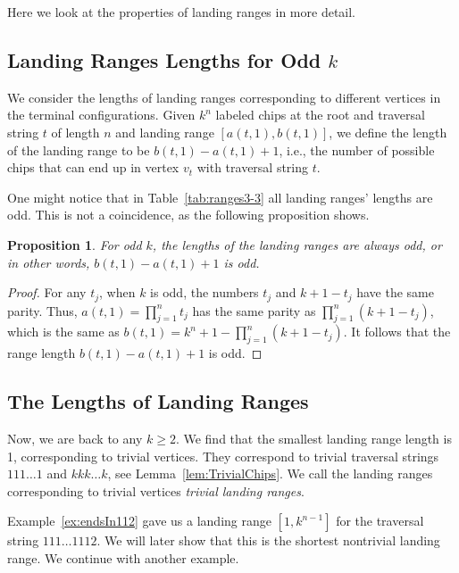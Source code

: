\documentclass[11pt]{article}
\newtheorem{proposition}[theorem]{Proposition}
\theoremstyle{definition}
\theoremstyle{remark}
\begin{document}
Here we look at the properties of landing ranges in more detail.

\subsection{Landing Ranges Lengths for Odd \texorpdfstring{$k$}{k}}

We consider the lengths of landing ranges corresponding to different vertices in the terminal configurations. Given $k^n$ labeled chips at the root and traversal string $t$ of length $n$ and landing range $[a(t, 1), b(t, 1)]$, we define the length of the landing range to be $b(t, 1)-a(t, 1) + 1$, i.e., the number of possible chips that can end up in vertex $v_t$ with traversal string $t$.

One might notice that in Table~\ref{tab:ranges3-3} all landing ranges' lengths are odd. This is not a coincidence, as the following proposition shows.

\begin{proposition}
    For odd $k$, the lengths of the landing ranges are always odd, or in other words, $b(t,1) - a(t,1) + 1$ is odd. 
\end{proposition}

\begin{proof}
    For any $t_j$, when $k$ is odd, the numbers $t_j$ and $k+1-t_j$ have the same parity. Thus, $a(t,1) = \prod_{j=1}^n t_j$ has the same parity as $\prod_{j=1}^n(k+1-t_j)$, which is the same as $b(t,1) = k^n+1 - \prod_{j=1}^n(k+1-t_j)$. It follows that the range length $b(t,1) - a(t,1) + 1$ is odd.
\end{proof}


\subsection{The Lengths of Landing Ranges}

Now, we are back to any $k \geq 2$. We find that the smallest landing range length is 1, corresponding to trivial vertices. They correspond to trivial traversal strings $111\dots 1$ and $kkk\dots k$, see Lemma~\ref{lem:TrivialChips}. We call the landing ranges corresponding to trivial vertices \textit{trivial landing ranges}.

Example~\ref{ex:endsIn112} gave us a landing range $[1,k^{n-1}]$ for the traversal string $111\dots 1112$. We will later show that this is the shortest nontrivial landing range. We continue with another example.
\end{document}
